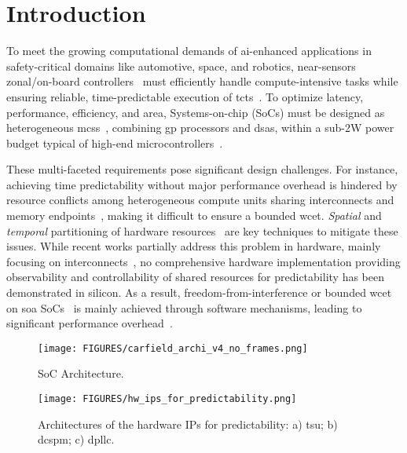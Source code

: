 
\section{Introduction}

To meet the growing computational demands of \gls{ai}-enhanced applications in safety-critical domains like automotive, space, and robotics, near-sensors zonal/on-board controllers~\cite{burkacky2023getting} must efficiently handle compute-intensive tasks while ensuring reliable, time-predictable execution of \glspl{tct}~\cite{rehmRoadPredictableAutomotive2021}. To optimize latency, performance, efficiency, and area, Systems-on-chip (SoCs) must be designed as heterogeneous \glspl{mcs}~\cite{jiangReThinkingMixedCriticalityArchitecture2020}, combining \gls{gp} processors and \glspl{dsa}, within a sub-2W power budget typical of high-end microcontrollers~\cite{ojoReviewLowEndMiddleEnd2018}. 

These multi-faceted requirements pose significant design challenges. For instance, achieving time predictability without major performance overhead is hindered by resource conflicts among heterogeneous compute units sharing interconnects and memory endpoints~\cite{majumder2020partaa}, making it difficult to ensure a bounded \gls{wcet}. \textit{Spatial} and \textit{temporal} partitioning of hardware resources~\cite{kloda2019deterministic} are key techniques to mitigate these issues. While recent works partially address this problem in hardware, mainly focusing on interconnects~\cite{jiang2022axi, benz2025axi}, no comprehensive hardware implementation providing observability and controllability of shared resources for predictability has been demonstrated in silicon. As a result, freedom-from-interference or bounded \gls{wcet} on \gls{soa} SoCs~\cite{nxp_industrial_control, valenteHeterogeneousRISCVBased2024, grossierASILDAutomotivegradeMicrocontroller2023} is mainly achieved through software mechanisms, leading to significant performance overhead~\cite{6531078}.

\begin{figure}[!t]
    \centering
    \texttt{[image: FIGURES/carfield\_archi\_v4\_no\_frames.png]}
    \caption{SoC Architecture.}
    \label{fig:soc-archi}
\end{figure}

\begin{figure*}[!t]
    \centering
    \texttt{[image: FIGURES/hw\_ips\_for\_predictability.png]}
    \caption{Architectures of the hardware IPs for predictability: a) \gls{tsu}; b) \gls{dcspm}; c) \gls{dpllc}.}
    \label{fig:hw-ips-for-predictability}
\end{figure*}


